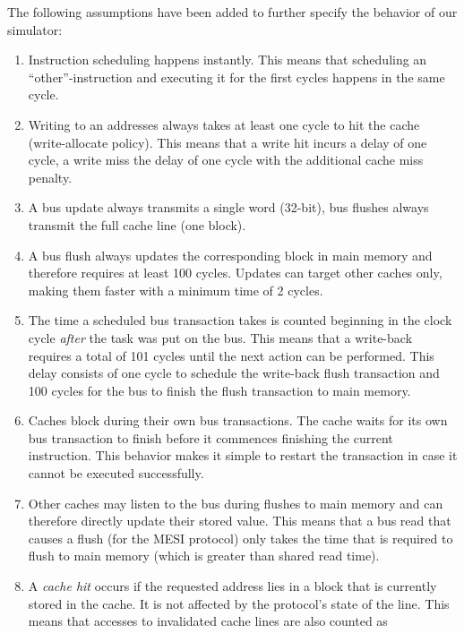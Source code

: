The following assumptions have been added to further specify the behavior of our
simulator:
\begin{enumerate}
    \item Instruction scheduling happens instantly. This means that scheduling an
          ``other''-instruction and executing it for the first cycles happens in the same
          cycle.
    \item Writing to an addresses always takes at least one cycle to hit the cache
          (write-allocate policy). This means that a write hit incurs a delay of one
          cycle, a write miss the delay of one cycle with the additional cache miss
          penalty.
    \item A bus update always transmits a single word (32-bit), bus flushes always
          transmit the full cache line (one block).
    \item A bus flush always updates the corresponding block in main memory and
          therefore requires at least 100 cycles. Updates can target other caches only,
          making them faster with a minimum time of 2 cycles.
    \item The time a scheduled bus transaction takes is counted beginning in the
          clock cycle \emph{after} the task was put on the bus. This means that a
          write-back requires a total of 101 cycles until the next action can be
          performed. This delay consists of one cycle to schedule the write-back flush
          transaction and 100 cycles for the bus to finish the flush transaction to main
          memory.
    \item Caches block during their own bus transactions. The cache waits for its
          own bus transaction to finish before it commences finishing the current
          instruction. This behavior makes it simple to restart the transaction in case it
          cannot be executed successfully.
    \item Other caches may listen to the bus during flushes to main memory and can
          therefore directly update their stored value. This means that a bus read that
          causes a flush (for the MESI protocol) only takes the time that is required to
          flush to main memory (which is greater than shared read time).
    \item A \emph{cache hit} occurs if the requested address lies in a block that is
          currently stored in the cache. It is not affected by the protocol's state of the
          line. This means that accesses to invalidated cache lines are also counted as

\end{enumerate}
